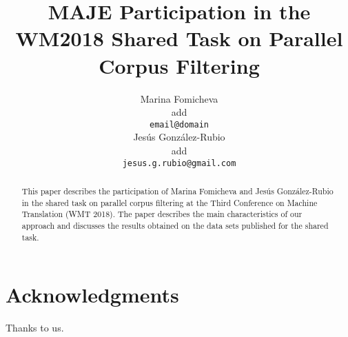 \documentclass[11pt,a4paper]{article}
\title{MAJE Participation in the WM2018 Shared Task on Parallel Corpus Filtering}
\author{Marina Fomicheva \\
  add \\
  {\tt email@domain} \\\And
  Jes\'us Gonz\'alez-Rubio \\
  add\\
  {\tt jesus.g.rubio@gmail.com} \\}
\date{}
\begin{document}
\maketitle
\begin{abstract}
  This paper describes the participation of Marina Fomicheva and Jes\'us Gonz\'alez-Rubio in the shared task on parallel corpus filtering at the Third Conference on Machine Translation (WMT 2018). The paper describes the main characteristics of our approach and discusses the results obtained on the data sets published for the shared task.
\end{abstract}








\section*{Acknowledgments}
Thanks to us.





\end{document}
